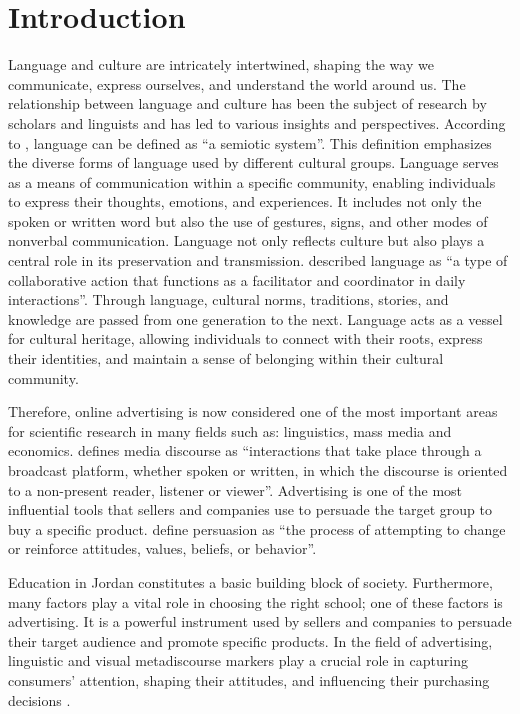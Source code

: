 \documentclass[english]{textolivre}
\begin{document}
\section{Introduction}
Language and culture are intricately intertwined, shaping the way we communicate, express ourselves, and understand the world around us. The relationship between language and culture has been the subject of research by scholars and linguists and has led to various insights and perspectives. According to \textcite[p.~192]{Halliday_1985}, language can be defined as “a semiotic system”. This definition emphasizes the diverse forms of language used by different cultural groups. Language serves as a means of communication within a specific community, enabling individuals to express their thoughts, emotions, and experiences. It includes not only the spoken or written word but also the use of gestures, signs, and other modes of nonverbal communication. Language not only reflects culture but also plays a central role in its preservation and transmission. \textcite[p.~42]{clark_using_1996} described language as “a type of collaborative action that functions as a facilitator and coordinator in daily interactions”. Through language, cultural norms, traditions, stories, and knowledge are passed from one generation to the next. Language acts as a vessel for cultural heritage, allowing individuals to connect with their roots, express their identities, and maintain a sense of belonging within their cultural community.

Therefore, online advertising is now considered one of the most important areas for scientific research in many fields such as: linguistics, mass media and economics.  defines media discourse as “interactions that take place through a broadcast platform, whether spoken or written, in which the discourse is oriented to a non-present reader, listener or viewer”. Advertising is one of the most influential tools that sellers and companies use to persuade the target group to buy a specific product. \textcite[p.~4]{wahl_persuasion_2021} define persuasion as “the process of attempting to change or reinforce attitudes, values, beliefs, or behavior”.

Education in Jordan constitutes a basic building block of society. Furthermore, many factors play a vital role in choosing the right school; one of these factors is advertising. It is a powerful instrument used by sellers and companies to persuade their target audience and promote specific products. In the field of advertising, linguistic and visual metadiscourse markers play a crucial role in capturing consumers' attention, shaping their attitudes, and influencing their purchasing decisions \cite{moriarty_advertising:_2014}.
\end{document}
